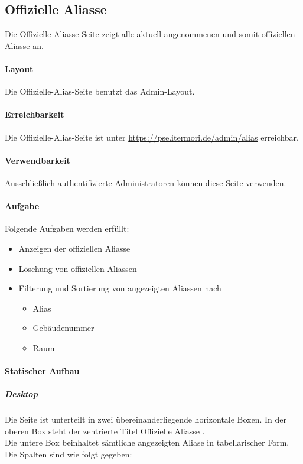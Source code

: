 \subsection{Offizielle Aliasse}

Die Offizielle-Aliasse-Seite zeigt alle aktuell angenommenen und somit offiziellen Aliasse an.

\paragraph*{Layout}
Die Offizielle-Alias-Seite benutzt das Admin-Layout.

\paragraph*{Erreichbarkeit}
Die Offizielle-Alias-Seite ist unter \href{https://pse.itermori.de/admin/alias}{https://pse.itermori.de/admin/alias} erreichbar.

\paragraph*{Verwendbarkeit}
Ausschließlich authentifizierte Administratoren können diese Seite verwenden.

\paragraph*{Aufgabe}
Folgende Aufgaben werden erfüllt:

\begin{itemize}
    \item Anzeigen der offiziellen Aliasse
    \item Löschung von offiziellen Aliassen
    \item Filterung und Sortierung von angezeigten Aliassen nach 
    \begin{itemize}
        \item Alias
        \item Gebäudenummer
        \item Raum
    \end{itemize}
\end{itemize}

\paragraph*{Statischer Aufbau}
\subparagraph*{Desktop}
Die Seite ist unterteilt in zwei übereinanderliegende horizontale Boxen.
In der oberen Box steht der zentrierte Titel \dq Offizielle Aliasse \dq. \\
Die untere Box beinhaltet sämtliche angezeigten Aliase in tabellarischer Form. Die Spalten sind wie folgt gegeben:

